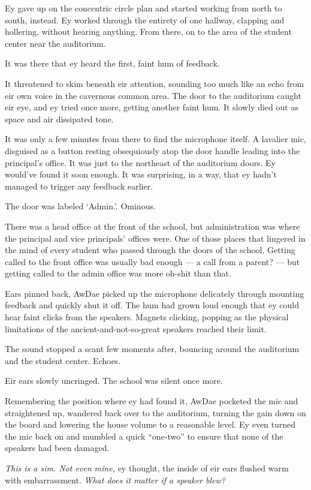Ey gave up on the concentric circle plan and started working from north to south, instead. Ey worked through the entirety of one hallway, clapping and hollering, without hearing anything. From there, on to the area of the student center near the auditorium.

It was there that ey heard the first, faint hum of feedback.

It threatened to skim beneath eir attention, sounding too much like an echo from eir own voice in the cavernous common area. The door to the auditorium caught eir eye, and ey tried once more, getting another faint hum. It slowly died out as space and air dissipated tone.

It was only a few minutes from there to find the microphone itself. A lavalier mic, disguised as a button resting obsequiously atop the door handle leading into the principal's office. It was just to the northeast of the auditorium doors. Ey would've found it soon enough. It was surprising, in a way, that ey hadn't managed to trigger any feedback earlier.

The door was labeled `Admin.'. Ominous.

There was a head office at the front of the school, but administration was where the principal and vice principals' offices were. One of those places that lingered in the mind of every student who passed through the doors of the school. Getting called to the front office was usually bad enough — a call from a parent? — but getting called to the admin office was more oh-shit than that.

Ears pinned back, AwDae picked up the microphone delicately through mounting feedback and quickly shut it off. The hum had grown loud enough that ey could hear faint clicks from the speakers. Magnets clicking, popping as the physical limitations of the ancient-and-not-so-great speakers reached their limit.

The sound stopped a scant few moments after, bouncing around the auditorium and the student center. Echoes.

Eir ears slowly uncringed. The school was silent once more.

Remembering the position where ey had found it, AwDae pocketed the mic and straightened up, wandered back over to the auditorium, turning the gain down on the board and lowering the house volume to a reasonable level. Ey even turned the mic back on and mumbled a quick ``one-two'' to ensure that none of the speakers had been damaged.

\emph{This is a sim. Not even mine,} ey thought, the inside of eir ears flushed warm with embarrassment. \emph{What does it matter if a speaker blew?}

